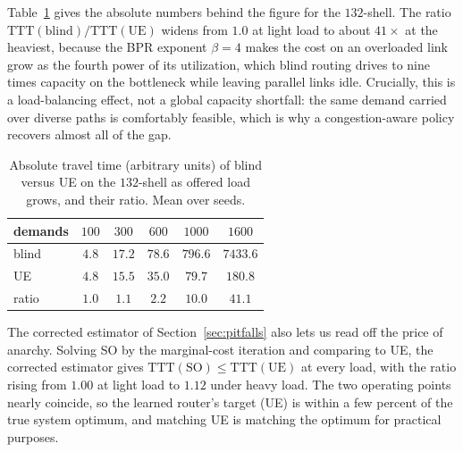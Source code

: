 \documentclass[journal]{IEEEtran}
\newcommand{\TTT}{\mathrm{TTT}}
\begin{document}
Table~\ref{tab:headroom} gives the absolute numbers behind the figure for the
$132$-shell. The ratio $\TTT(\mathrm{blind})/\TTT(\mathrm{UE})$ widens from $1.0$ at
light load to about $41\times$ at the heaviest, because the BPR exponent $\beta{=}4$
makes the cost on an overloaded link grow as the fourth power of its utilization, which
blind routing drives to nine times capacity on the bottleneck while leaving parallel
links idle. Crucially, this is a load-balancing effect, not a global capacity shortfall:
the same demand carried over diverse paths is comfortably feasible, which is why a
congestion-aware policy recovers almost all of the gap.

\begin{table}[t]
\centering\footnotesize\setlength{\tabcolsep}{3pt}
\caption{Absolute travel time (arbitrary units) of blind versus UE on the $132$-shell as
offered load grows, and their ratio. Mean over seeds.}
\label{tab:headroom}
\begin{tabular}{lccccc}
\toprule
demands & $100$ & $300$ & $600$ & $1000$ & $1600$ \\
\midrule
blind & $4.8$ & $17.2$ & $78.6$ & $796.6$ & $7433.6$ \\
UE & $4.8$ & $15.5$ & $35.0$ & $79.7$ & $180.8$ \\
ratio & $1.0$ & $1.1$ & $2.2$ & $10.0$ & $41.1$ \\
\bottomrule
\end{tabular}
\end{table}

The corrected estimator of Section~\ref{sec:pitfalls} also lets us read off the price of
anarchy. Solving SO by the marginal-cost iteration and comparing to UE,
the corrected estimator gives $\TTT(\mathrm{SO})\le\TTT(\mathrm{UE})$ at every load, with the
ratio rising from $1.00$ at light load to $1.12$ under heavy load. The two operating
points nearly coincide, so the learned router's target (UE) is within a few percent of
the true system optimum, and matching UE is matching the optimum for practical purposes.
\end{document}
